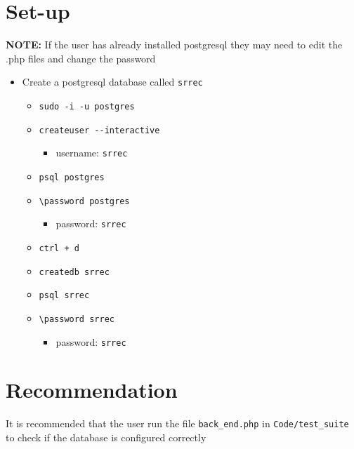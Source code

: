 \documentclass[10pt, a4paper, onecolumn]{scrartcl}
\providecommand{\tightlist}{%
	\setlength{\itemsep}{0pt}\setlength{\parskip}{0pt}}
\begin{document}
	\section{Set-up}
	
	\textbf{NOTE:} If the user has already installed postgresql they may
	need to edit the .php files and change the password
	
	\begin{itemize}
		\tightlist
		\item
		Create a postgresql database called \texttt{srrec}
		
		\begin{itemize}
			\tightlist
			\item
			\texttt{sudo\ -i\ -u\ postgres}
			\item
			\texttt{createuser\ -\/-interactive}
			
			\begin{itemize}
				\tightlist
				\item
				username: \texttt{srrec}
			\end{itemize}
			\item
			\texttt{psql\ postgres}
			\item
			\texttt{\textbackslash{}password\ postgres}
			
			\begin{itemize}
				\tightlist
				\item
				password: \texttt{srrec}
			\end{itemize}
			\item
			\texttt{ctrl\ +\ d}
			\item
			\texttt{createdb\ srrec}
			\item
			\texttt{psql\ srrec}
			\item
			\texttt{\textbackslash{}password\ srrec}
			
			\begin{itemize}
				\tightlist
				\item
				password: \texttt{srrec}
			\end{itemize}
		\end{itemize}
	\end{itemize}
	
	\section{Recommendation}
	
	It is recommended that the user run the file \texttt{back\_end.php} in
	\texttt{Code/test\_suite} to check if the database is configured
	correctly
	
\end{document}
